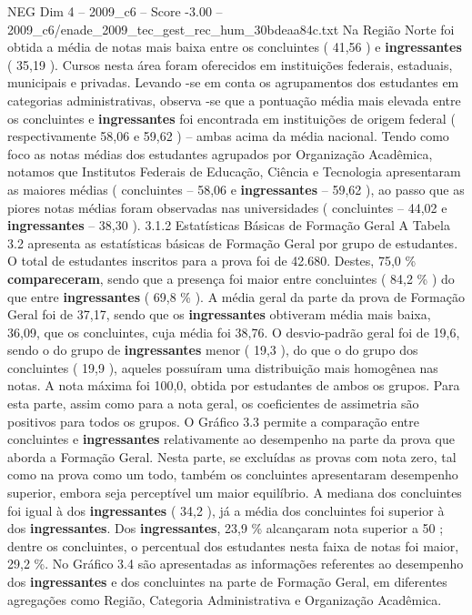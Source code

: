 \begin{textsample}{NEG Dim 4 – 2009\_c6 – Score -3.00 – 2009\_c6/enade\_2009\_tec\_gest\_rec\_hum\_30bdeaa84c.txt}
Na Região Norte foi obtida a média de notas mais baixa entre os concluintes ( 41,56 ) e \textbf{ingressantes} ( 35,19 ).
Cursos nesta área foram oferecidos em instituições federais, estaduais, municipais e privadas.
Levando -se em conta os agrupamentos dos estudantes em categorias administrativas, observa -se que a pontuação média mais elevada entre os concluintes e \textbf{ingressantes} foi encontrada em instituições de origem federal ( respectivamente 58,06 e 59,62 ) – ambas acima da média nacional.
Tendo como foco as notas médias dos estudantes agrupados por Organização Acadêmica, notamos que Institutos Federais de Educação, Ciência e Tecnologia apresentaram as maiores médias ( concluintes – 58,06 e \textbf{ingressantes} – 59,62 ), ao passo que as piores notas médias foram observadas nas universidades ( concluintes – 44,02 e \textbf{ingressantes} – 38,30 ). 3.1.2 Estatísticas Básicas de Formação Geral A Tabela 3.2 apresenta as estatísticas básicas de Formação Geral por grupo de estudantes.
O total de estudantes inscritos para a prova foi de 42.680.
Destes, 75,0 \% \textbf{compareceram}, sendo que a presença foi maior entre concluintes ( 84,2 \% ) do que entre \textbf{ingressantes} ( 69,8 \% ).
A média geral da parte da prova de Formação Geral foi de 37,17, sendo que os \textbf{ingressantes} obtiveram média mais baixa, 36,09, que os concluintes, cuja média foi 38,76.
O desvio-padrão geral foi de 19,6, sendo o do grupo de \textbf{ingressantes} menor ( 19,3 ), do que o do grupo dos concluintes ( 19,9 ), aqueles possuíram uma distribuição mais homogênea nas notas.
A nota máxima foi 100,0, obtida por estudantes de ambos os grupos.
Para esta parte, assim como para a nota geral, os coeficientes de assimetria são positivos para todos os grupos.
O Gráfico 3.3 permite a comparação entre concluintes e \textbf{ingressantes} relativamente ao desempenho na parte da prova que aborda a Formação Geral.
Nesta parte, se excluídas as provas com nota zero, tal como na prova como um todo, também os concluintes apresentaram desempenho superior, embora seja perceptível um maior equilíbrio.
A mediana dos concluintes foi igual à dos \textbf{ingressantes} ( 34,2 ), já a média dos concluintes foi superior à dos \textbf{ingressantes}.
Dos \textbf{ingressantes}, 23,9 \% alcançaram nota superior a 50 ; dentre os concluintes, o percentual dos estudantes nesta faixa de notas foi maior, 29,2 \%.
No Gráfico 3.4 são apresentadas as informações referentes ao desempenho dos \textbf{ingressantes} e dos concluintes na parte de Formação Geral, em diferentes agregações como Região, Categoria Administrativa e Organização Acadêmica.

\end{textsample}
